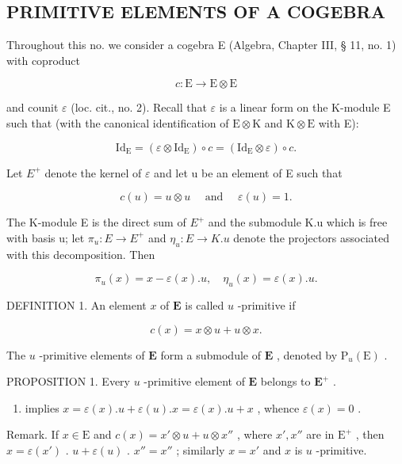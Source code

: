 \subsection{PRIMITIVE ELEMENTS OF A COGEBRA}

Throughout this no. we consider a cogebra E (Algebra, Chapter III, § 11, no. 1) with coproduct

\[
c \colon \mathrm{E} \rightarrow \mathrm{E} \otimes \mathrm{E}
\]

and counit \(\varepsilon\) (loc. cit., no. 2). Recall that \(\varepsilon\) is a linear form on the K-module E such that (with the canonical identification of \(\mathrm{E} \otimes \mathrm{K}\) and \(\mathrm{K} \otimes \mathrm{E}\) with E):

\[
\mathrm{Id} _ {\mathrm{E}} = (\varepsilon \otimes \mathrm{Id} _ {\mathrm{E}}) \circ c = (\mathrm{Id} _ {\mathrm{E}} \otimes \varepsilon) \circ c.
\]

Let \(E^{+}\) denote the kernel of \(\varepsilon\) and let u be an element of E such that

\[
c (u) = u \otimes u \quad \text { and } \quad \varepsilon (u) = 1.
\]

The K-module E is the direct sum of \(E^{+}\) and the submodule K.u which is free with basis u; let \(\pi_{u}: E \to E^{+}\) and \(\eta_{u}: E \to K.u\) denote the projectors associated with this decomposition. Then

\[
\pi_ {u} (x) = x - \varepsilon (x). u, \quad \eta_ {u} (x) = \varepsilon (x). u.\tag{1}
\]

DEFINITION 1. An element \(x\) of \(\mathbf{E}\) is called \(u\) -primitive if

\[
c (x) = x \otimes u + u \otimes x.\tag{2}
\]

The \(u\) -primitive elements of \(\mathbf{E}\) form a submodule of \(\mathbf{E}\) , denoted by \(\mathrm{P}_{u}(\mathrm{E})\) .

PROPOSITION 1. Every \(u\) -primitive element of \(\mathbf{E}\) belongs to \(\mathbf{E}^{+}\) .

\begin{enumerate}
\def\labelenumi{(\arabic{enumi})}
\setcounter{enumi}{1}
\tightlist
\item
  implies \(x = \varepsilon(x).u + \varepsilon(u).x = \varepsilon(x).u + x\) , whence \(\varepsilon(x) = 0\) .
\end{enumerate}

Remark. If \(x \in \mathrm{E}\) and \(c(x) = x' \otimes u + u \otimes x''\) , where \(x', x''\) are in \(\mathrm{E}^+\) , then \(x = \varepsilon(x')\) . \(u + \varepsilon(u)\) . \(x'' = x''\) ; similarly \(x = x'\) and \(x\) is \(u\) -primitive.

